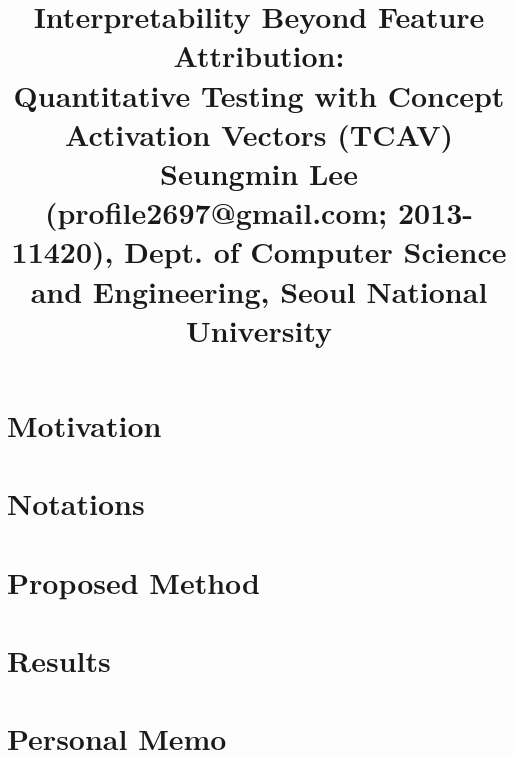 \documentclass[10pt,twocolumn,letterpaper]{article}
\begin{document}
\title{Interpretability Beyond Feature Attribution: \\Quantitative Testing with Concept Activation Vectors (TCAV)
	 \\ {\rm {\normalsize Seungmin Lee (profile2697@gmail.com; 2013-11420), Dept. of Computer Science and Engineering, Seoul National University}}} 

\maketitle
\thispagestyle{empty}


\section{Motivation}


\section{Notations}


\section{Proposed Method}


\section{Results}


\section{Personal Memo}


{\small

% 
}
\end{document}
